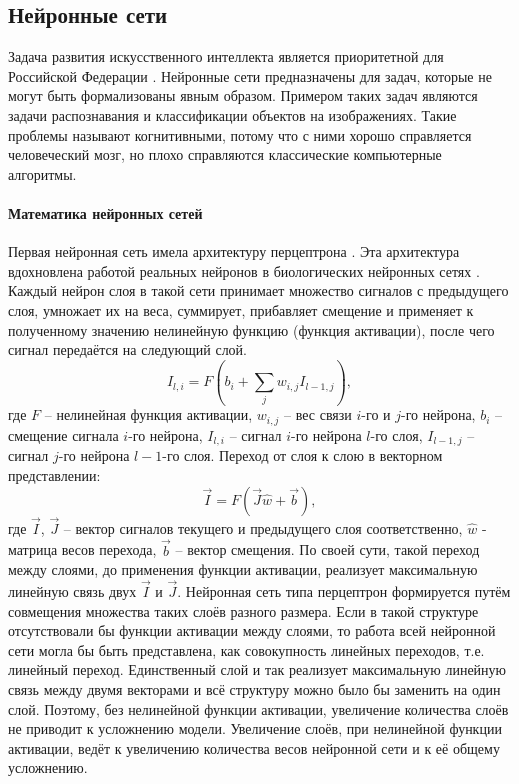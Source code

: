 \subsection{Нейронные сети}\label{sec:ANN}
Задача развития искусственного интеллекта является приоритетной для Российской Федерации \cite{Russia}. Нейронные сети предназначены для задач, которые не могут быть формализованы явным образом. Примером таких задач являются задачи распознавания и классификации объектов на изображениях. Такие проблемы называют когнитивными, потому что с ними хорошо справляется человеческий мозг, но плохо справляются классические компьютерные алгоритмы.

\paragraph{Математика нейронных сетей}
Первая нейронная сеть имела архитектуру перцептрона \cite{rosenblatt1958perceptron}. Эта архитектура вдохновлена работой реальных нейронов в биологических нейронных сетях \cite{block1962perceptron}. Каждый нейрон слоя в такой сети принимает множество сигналов с предыдущего слоя, умножает их на веса, суммирует, прибавляет смещение и применяет к полученному значению нелинейную функцию (функция активации), после чего сигнал передаётся на следующий слой.
\begin{equation}\label{eq:per1}
	I_{l,i}=F\left(b_i+\sum\limits_{j}{w_{i,j}I_{l-1,j}}\right),
\end{equation}
где $F$ -- нелинейная функция активации, $w_{i,j}$ -- вес связи $i$-го и $j$-го нейрона, $b_i$ -- смещение сигнала $i$-го нейрона, $I_{l,i}$ -- сигнал $i$-го нейрона $l$-го слоя, $I_{l-1,j}$ -- сигнал $j$-го нейрона $l-1$-го слоя. Переход от слоя к слою в векторном представлении:
\begin{equation}\label{eq:per2}
	\vec{I} = F\left(\vec{J}\hat{w} + \vec{b}\right),
\end{equation}
где $\vec{I}$, $\vec{J}$ -- вектор сигналов текущего и предыдущего слоя соответственно, $\hat{w}$ - матрица весов перехода, $\vec{b}$ -- вектор смещения. По своей сути, такой переход между слоями, до применения функции активации, реализует максимальную линейную связь двух $\vec{I}$ и $\vec{J}$. Нейронная сеть типа перцептрон формируется путём совмещения множества таких слоёв разного размера. Если в такой структуре отсутствовали бы функции активации между слоями, то работа всей нейронной сети могла бы быть представлена, как совокупность линейных переходов, т.е. линейный переход. Единственный слой и так реализует максимальную линейную связь между двумя векторами и всё структуру можно было бы заменить на один слой. Поэтому, без нелинейной функции активации, увеличение количества слоёв не приводит к усложнению модели. Увеличение слоёв, при нелинейной функции активации, ведёт к увеличению количества весов нейронной сети и к её общему усложнению.
